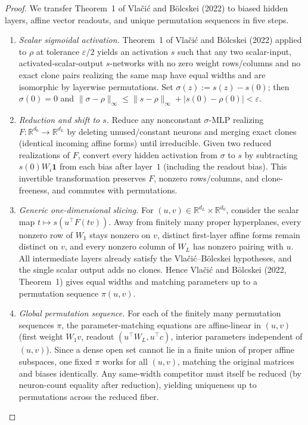 \documentclass[11pt]{article}
\theoremstyle{plain}
\theoremstyle{definition}
\theoremstyle{remark}
\begin{document}
\begin{proof}
We transfer Theorem~1 of Vla\v{c}i\'c and B\"olcskei (2022) to biased hidden layers, affine vector readouts, and unique permutation sequences in five steps.
\begin{enumerate}[leftmargin=2em,label=\textup{(\arabic*)}]
\item \emph{Scalar sigmoidal activation.} Theorem~1 of Vla\v{c}i\'c and B\"olcskei (2022) applied to $\rho$ at tolerance $\varepsilon/2$ yields an activation $s$ such that any two scalar-input, activated-scalar-output $s$-networks with no zero weight rows/columns and no exact clone pairs realizing the same map have equal widths and are isomorphic by layerwise permutations. Set $\sigma(z) := s(z) - s(0)$; then $\sigma(0) = 0$ and $\|\sigma - \rho\|_\infty \le \|s - \rho\|_\infty + |s(0) - \rho(0)| < \varepsilon$.
\item \emph{Reduction and shift to $s$.} Reduce any nonconstant $\sigma$-MLP realizing $F : \mathbb{R}^{d_0} \to \mathbb{R}^{d_L}$ by deleting unused/constant neurons and merging exact clones (identical incoming affine forms) until irreducible. Given two reduced realizations of $F$, convert every hidden activation from $\sigma$ to $s$ by subtracting $s(0)W_i \mathbf{1}$ from each bias after layer~$1$ (including the readout bias). This invertible transformation preserves $F$, nonzero rows/columns, and clone-freeness, and commutes with permutations.
\item \emph{Generic one-dimensional slicing.} For $(u, v) \in \mathbb{R}^{d_L} \times \mathbb{R}^{d_0}$, consider the scalar map $t \mapsto s(u^\top F(tv))$. Away from finitely many proper hyperplanes, every nonzero row of $W_1$ stays nonzero on $v$, distinct first-layer affine forms remain distinct on $v$, and every nonzero column of $W_L$ has nonzero pairing with $u$. All intermediate layers already satisfy the Vla\v{c}i\'c--B\"olcskei hypotheses, and the single scalar output adds no clones. Hence Vla\v{c}i\'c and B\"olcskei (2022, Theorem~1) gives equal widths and matching parameters up to a permutation sequence $\pi(u, v)$.
\item \emph{Global permutation sequence.} For each of the finitely many permutation sequences $\pi$, the parameter-matching equations are affine-linear in $(u, v)$ (first weight $W_1 v$, readout $(u^\top W_L, u^\top c)$, interior parameters independent of $(u, v)$). Since a dense open set cannot lie in a finite union of proper affine subspaces, one fixed $\pi$ works for all $(u, v)$, matching the original matrices and biases identically. Any same-width competitor must itself be reduced (by neuron-count equality after reduction), yielding uniqueness up to permutations across the reduced fiber.

\end{enumerate}
\end{proof}
\end{document}
